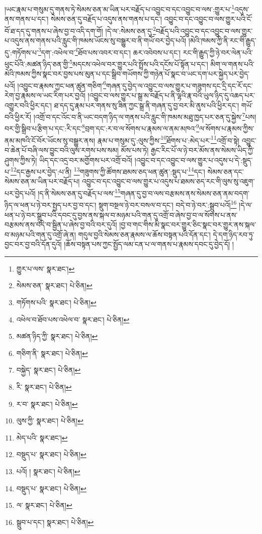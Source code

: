 །ཡང་རྣམ་པ་གསུམ་དུ་གནས་ཏེ་སེམས་ཅན་མ་ཡིན་པར་བརྗོད་པ་འབྱུང་བ་དང་འབྱུང་བ་ལས་:གྱུར་པ་\footnote{གྱུར་པ་ལས་  སྣར་ཐང་། }འདུས་ནས་གནས་པ་དང་། སེམས་ཅན་དུ་བརྗོད་པ་འདུས་ནས་གནས་པ་དང་། འབྱུང་བ་དང་འབྱུང་བ་ལས་གྱུར་པའི་ངོ་བོ་ཐ་དད་དུ་གནས་པ་ཞེས་བྱ་བ་འདི་དག་གོ། །དེ་ལ་:སེམས་ཅན་དུ་\footnote{སེམས་ཅན་  སྣར་ཐང་།  པེ་ཅིན། }བརྗོད་པའི་འབྱུང་བ་དང་འབྱུང་བ་ལས་གྱུར་པ་འདུས་ནས་གནས་པའི་རླུང་གི་ཁམས་ཡོངས་སུ་བསྒྱུར་བ་ནི་གཡོ་བར་བྱེད་པའོ། །མེའི་ཁམས་ཀྱི་ནི་རང་གི་རྒྱུད་དུ་:གཏོགས་པ་\footnote{གཏོགས་པའི་  སྣར་ཐང་།  པེ་ཅིན། }དག་:འཕེལ་བ་\footnote{འཕེལ་བ་ཐོབ་པས་འཕེལ་བ་  སྣར་ཐང་།  པེ་ཅིན། }ཐོབ་པས་འབར་བ་དང་། ཆར་འབེབས་པ་དང་། རང་གི་རྒྱུད་ཀྱི་ཉེ་བར་ལེན་པའི་ཕུང་པོའི་:མཚན་ཉིད་ཅན་གྱི་\footnote{མཚན་ཉིད་ཀྱི་  སྣར་ཐང་།  པེ་ཅིན། }མདངས་འཕེལ་བར་གྱུར་པའི་སྤྲོས་པའི་དངོས་པོ་སྟོན་པ་དང་། མིག་ལ་གནས་པའི་མེའི་ཁམས་ཀྱིས་སྣང་བར་བྱས་པས་མུན་པ་དང་སྒྲིབ་གཡོགས་ཀྱི་གཉེན་པོ་སྣང་བ་ཡང་དག་པར་སྐྱེད་པར་བྱེད་པའོ། །འབྱུང་བ་རྣམས་ཀྱང་ཕན་ཚུན་གཅིག་\footnote{གཅིག་ནི་  སྣར་ཐང་།  པེ་ཅིན། }གཞན་དུ་བྱེད་ལ་འབྱུང་བ་ལས་གྱུར་པ་གཟུགས་དང་དྲི་དང་རོ་དང་རེག་བྱ་རྣམས་ལ་ཡང་རིག་པར་བྱའོ། །འབྱུང་བ་ལས་གྱུར་པ་སྒྲ་མ་བརྗོད་པ་ནི་ལྷའི་རྣ་བའི་ཡུལ་ཉིད་དུ་འཆད་པར་འགྱུར་བའི་ཕྱིར་དང་། ཐ་དད་དུ་རྣམ་པར་གནས་སུ་ཟིན་ཀྱང་སྒྲ་ནི་གཞན་དུ་བྱ་བར་མི་ནུས་པའི་ཕྱིར་དང་། གཡོ་བའི་ཕྱིར་རོ། །འགྲོ་བ་དང་འོང་བ་ནི་ཡང་བདག་ཉིད་ལ་གནས་པའི་རླུང་གི་ཁམས་མཐུ་ཁྱད་པར་ཅན་དུ་སྐྱེས་\footnote{བསྐྱེད་  སྣར་ཐང་།  པེ་ཅིན། }པས། བར་གྱི་སྒྲིབ་པ་རྩིག་པ་དང་:རི་དང་\footnote{རི་  སྣར་ཐང་།  པེ་ཅིན། }བྲག་དང་:ར་བ་ལ་སོགས་པ་རྣམས་ལ་ནམ་མཁའ་\footnote{ར་བ་  སྣར་ཐང་།  པེ་ཅིན། }ལ་སོགས་པ་རྣམས་ཀྱིས་ནམ་མཁའི་ངོ་བོར་ཡོངས་སུ་བསྒྱུར་ནས། རྣམ་པ་གསུམ་དུ་:ལུས་ཀྱིས་\footnote{ལུས་ཀྱི་  སྣར་ཐང་།  པེ་ཅིན། }ཐོགས་པ་:མེད་པར་\footnote{མེད་པའི་  སྣར་ཐང་། }འགྲོ་བ་སྟེ། འབྱུང་བ་ཆེན་པོ་བཞི་ལས་བྱུང་བའི་ལུས་རགས་པས་སམ། མོས་པས་ཏེ། རྒྱང་རིང་པོ་ལ་ཉེ་བར་མོས་ནས་སེམས་ཡིད་ཀྱི་ཤུགས་ཀྱིས་ཏེ། ཡིད་དང་འདྲ་བར་མགྱོགས་པར་འགྲོ་བའོ། །འབྱུང་བ་དང་འབྱུང་བ་ལས་གྱུར་པ་འདུས་པ་དེ་:སྡུད་པ་\footnote{བསྡུད་པ་  སྣར་ཐང་།  པེ་ཅིན། }དང་རྒྱས་པར་བྱེད་:པ་ནི། \footnote{པའོ། །   སྣར་ཐང་།  པེ་ཅིན། }གཟུགས་ཀྱི་ཚོགས་ཐམས་ཅད་ཕན་ཚུན་:སྡུད་པ་\footnote{བསྡུད་པ་  སྣར་ཐང་།  པེ་ཅིན། }དང་། སེམས་ཅན་དང་སེམས་ཅན་མ་ཡིན་པར་བརྗོད་པ། འབྱུང་བ་དང་འབྱུང་བ་ལས་གྱུར་པ་འདུས་པ་ཐམས་ཅད་རང་གི་ལུས་སུ་འཇུག་པར་བྱེད་པའོ། །ད་ནི་སེམས་ཅན་དུ་བརྗོད་པ་ལས་\footnote{ལ་  སྣར་ཐང་།  པེ་ཅིན། }གཞན་དུ་བྱ་བ་ལས་བརྩམས་ནས་སེམས་ཅན་ནམ་བདག་ཉིད་ལ་ཕན་པ་ཉེ་བར་སྤྱད་པར་བྱ་བ་དང་། སྡུག་བསྔལ་ཉེ་བར་བསལ་བ་དང་། བདེ་བ་ཉེ་བར་:སྒྲུབ་པའོ།\footnote{སྒྲུབ་པ་དང་།  སྣར་ཐང་།  པེ་ཅིན། } །དེ་ལ་ཕན་པ་ཉེ་བར་སྒྲུབ་པའི་དབང་དུ་བྱས་ནས་སྐལ་བ་མཉམ་པའི་གན་དུ་འགྲོ་བ་ཞེས་བྱ་བ་ལ་སོགས་པ་ནས་བརྩམས་ནས་བདེ་བ་སྦྱིན་པ་ཞེས་བྱ་བའི་བར་དུའོ། །བྱ་བ་གང་གིས་མི་སྣང་བར་གྱུར་ཅིང་སྣང་བར་གྱུར་ནས་སྐལ་བ་མཉམ་པའི་གན་དུ་འགྲོ་ཞེ་ན། གདུལ་བྱའི་སེམས་ཅན་རྣམས་ལ་ཆོས་བསྟན་པའི་དོན་དང་། དེ་དག་ཉིད་རབ་ཏུ་བྱང་བར་བྱ་བའི་དོན་དུའོ། །ཆོས་བསྟན་པས་ཀྱང་སྤྱོད་ལམ་ངན་པ་ལ་གནས་པ་རྣམས་དབང་དུ་བྱེད་དོ། །
